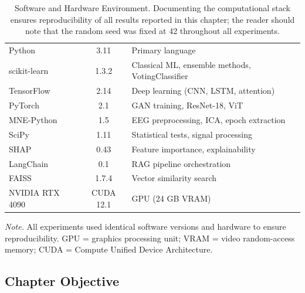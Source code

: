 \begin{table}[!htbp]
\tablestripes\tablefontsize
\caption[Software and Hardware Environment]{Software and Hardware Environment. Documenting the computational stack ensures reproducibility of all results reported in this chapter; the reader should note that the random seed was fixed at 42 throughout all experiments.}
\tablefontsize
\begin{tabularx}{\textwidth}{@{} >{\raggedright\arraybackslash}p{3cm} C L @{}}
\toprule
{} &  &  \\
\midrule
Python & 3.11 & Primary language \\
scikit-learn & 1.3.2 & Classical ML, ensemble methods, VotingClassifier \\
TensorFlow & 2.14 & Deep learning (CNN, LSTM, attention) \\
PyTorch & 2.1 & GAN training, ResNet-18, ViT \\
MNE-Python & 1.5 & EEG preprocessing, ICA, epoch extraction \\
SciPy & 1.11 & Statistical tests, signal processing \\
SHAP & 0.43 & Feature importance, explainability \\
LangChain & 0.1 & RAG pipeline orchestration \\
FAISS & 1.7.4 & Vector similarity search \\
\addlinespace
NVIDIA RTX 4090 & CUDA 12.1 & GPU (24 GB VRAM) \\
\bottomrule
\end{tabularx}
\vspace{0.5em}\noindent\textit{Note.} All experiments used identical software versions and hardware to ensure reproducibility. GPU = graphics processing unit; VRAM = video random-access memory; CUDA = Compute Unified Device Architecture.
\end{table}

\subsection{Chapter Objective}

